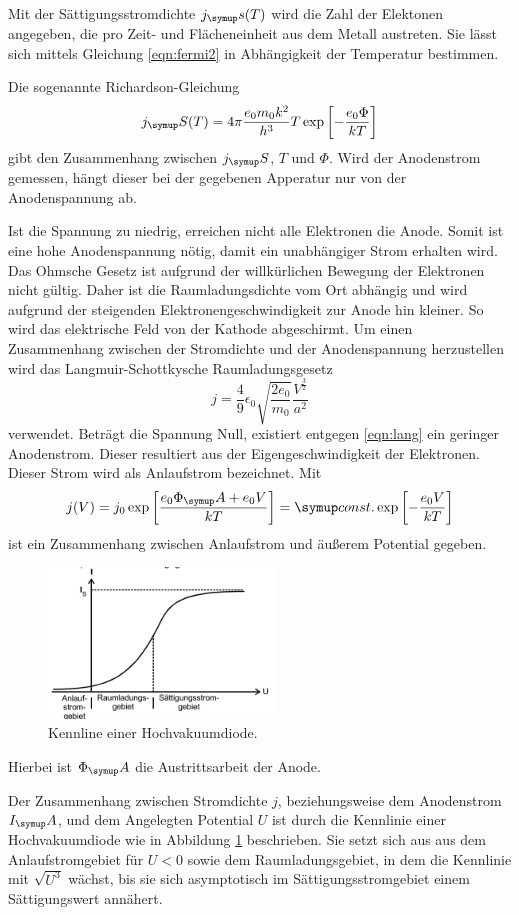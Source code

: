 Mit der Sättigungsstromdichte $j_\su{s}(T)$ wird die Zahl der Elektonen angegeben,
die pro Zeit- und Flächeneinheit aus dem Metall austreten. Sie lässt sich mittels
Gleichung \eqref{eqn:fermi2} in Abhängigkeit der Temperatur bestimmen.

Die sogenannte Richardson-Gleichung
\begin{equation*}
  j_\su{S}(T) = 4\pi\frac{e_0 m_0 k^2}{h^3}T\exp\left[-\frac{e_0\Phi}{kT}\right]
  \label{eqn:richard}
\end{equation*}
gibt den Zusammenhang zwischen $j_\su{S}$, $T$ und $\Phi$. Wird der Anodenstrom
gemessen, hängt dieser bei der gegebenen Apperatur nur von der Anodenspannung ab.

Ist die Spannung zu niedrig, erreichen nicht alle Elektronen die Anode. Somit ist
eine hohe Anodenspannung nötig, damit ein unabhängiger Strom erhalten wird.
Das Ohmsche Gesetz ist aufgrund der willkürlichen Bewegung der Elektronen nicht
gültig. Daher ist die Raumladungsdichte vom Ort abhängig und wird aufgrund der
steigenden Elektronengeschwindigkeit zur Anode hin kleiner. So wird das elektrische
Feld von der Kathode abgeschirmt.
Um einen Zusammenhang zwischen der Stromdichte und der Anodenspannung herzustellen
wird das Langmuir-Schottkysche Raumladungsgesetz
\begin{equation}
  j = \frac{4}{9}\epsilon_0\sqrt{\frac{2e_0}{m_0}}\frac{V^{\frac{3}{2}}}{a^2}
  \label{eqn:lang}
\end{equation}
verwendet.
Beträgt die Spannung Null, existiert entgegen \eqref{eqn:lang} ein geringer
Anodenstrom. Dieser resultiert aus der Eigengeschwindigkeit der Elektronen. Dieser
Strom wird als Anlaufstrom bezeichnet.
Mit
\begin{equation}
  j(V) = j_0\exp\left[\frac{e_0\Phi_\su{A}+e_0 V}{kT}\right] = \su{const.} \exp\left[-\frac
  {e_0V}{kT}\right]
  \label{eqn:T}
\end{equation}
ist ein Zusammenhang zwischen Anlaufstrom und äußerem Potential gegeben.

\begin{figure}
  \includegraphics[width=6cm]{bilder/kennlinie.jpg}
  \caption{Kennline einer Hochvakuumdiode.\cite{504}}
  \label{kenn}
\end{figure}
Hierbei ist $\Phi_\su{A}$ die Austrittsarbeit der Anode.

Der Zusammenhang zwischen Stromdichte $j$, beziehungsweise dem Anodenstrom $I_\su{A}$,
und dem Angelegten Potential $U$ ist durch die Kennlinie einer Hochvakuumdiode
wie in Abbildung \ref{kenn} beschrieben.
Sie setzt sich aus aus dem Anlaufstromgebiet für $U<0$ sowie dem Raumladungsgebiet,
in dem die Kennlinie mit $\sqrt{U^3}$ wächst, bis sie sich asymptotisch im
Sättigungsstromgebiet einem Sättigungswert annähert.
